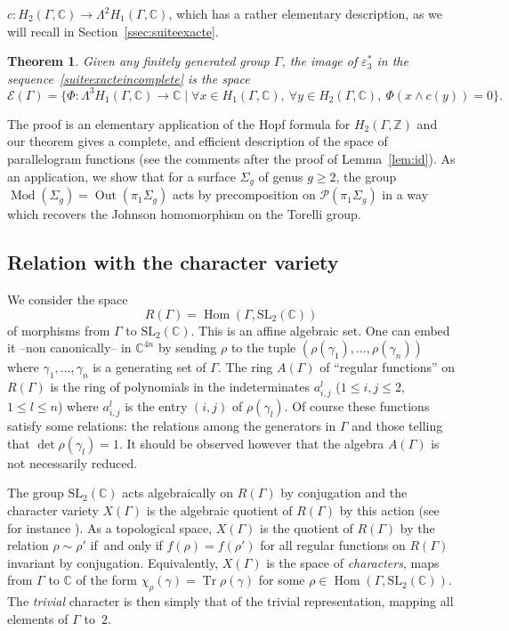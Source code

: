 \documentclass[JEP,XML,SOM,Unicode,NoEqCountersInSection]{cedram}
\let\mathcal\mathscr
\let\ra\rightarrow
\newtheorem{theorem}{Theorem}[section]
\theoremstyle{definition}
\newcommand{\ZZ}{\mathbb{Z}}
\newcommand{\CC}{\mathbb{C}}
\newcommand{\tr}{\operatorname{Tr}}
\newcommand{\SL}{\mathrm{SL}}
\newcommand{\Hom}{\operatorname{Hom}}
\begin{document}
$c:H_2(\Gamma,\CC)\to \Lambda^2 H_1(\Gamma,\CC)$,
which has a rather elementary description, as we will recall
in Section~\ref{ssec:suiteexacte}.
\begin{theorem}\label{theo:parallel}
Given any finitely generated group $\Gamma$, the image of
$\varepsilon_3^*$ in the sequence~\eqref{suiteexacteincomplete} is the
space
\[\mathcal{E}(\Gamma)=\bigl\lbrace
\Phi\colon\Lambda^3H_1(\Gamma,\CC)\ra\CC\mid\forall x\in H_1(\Gamma,\CC),\
\forall y\in H_2(\Gamma,\CC),\ \Phi(x\wedge c(y))=0
\bigr\rbrace. \]
\end{theorem}
The proof is an elementary application of the Hopf formula for
$H_2(\Gamma,\ZZ)$ and our theorem gives a complete, and efficient
description of the space of parallelogram functions (see the comments
after the proof of Lemma~\ref{lem:id}).
As an application, we show that for a surface $\Sigma_g$ of genus $g\geq 2$,
the group
$\operatorname{Mod}(\Sigma_g)=\operatorname{Out}(\pi_1 \Sigma_g)$ acts by
precomposition on $\mathcal{P}(\pi_1\Sigma_g)$ in a way which recovers
the Johnson homomorphism on the Torelli group.

\subsection{Relation with the character variety}\label{introcarac}

We consider the space
\[ R(\Gamma) = \Hom(\Gamma,\SL_2(\CC)) \]
of morphisms from $\Gamma$ to $\SL_2(\CC)$. This is an affine algebraic set.
One can embed it --non canonically-- in $\CC^{4n}$ by sending $\rho$ to the
tuple $(\rho(\gamma_1),\ldots,\rho(\gamma_n))$ where
$\gamma_1,\ldots,\gamma_n$ is a generating set of $\Gamma$.
The ring $A(\Gamma)$ of ``regular functions'' on $R(\Gamma)$ is the ring of
polynomials in the indeterminates $a_{i,j}^l$
($1\leq i,j\leq 2$, $1\leq l\leq n$)
where $a_{i,j}^l$ is the entry $(i,j)$ of $\rho(\gamma_l)$. Of course
these functions satisfy some relations: the relations among the generators
in $\Gamma$ and those telling that $\det \rho(\gamma_l)=1$.
It should be observed however that
the algebra $A(\Gamma)$ is not necessarily reduced.

The group $\SL_2(\CC)$ acts algebraically on $R(\Gamma)$ by conjugation and
the character variety $X(\Gamma)$ is the algebraic quotient of $R(\Gamma)$ by
this action (see for instance \cite[\S5.1]{Mukai}).
As a topological space, $X(\Gamma)$ is the quotient of
$R(\Gamma)$ by the relation $\rho\sim\rho'$ if~and only if
$f(\rho)=f(\rho')$ for all regular functions on $R(\Gamma)$ invariant
by conjugation.
Equivalently, $X(\Gamma)$ is the space of
{\em characters}, \ie 
maps from $\Gamma$ to $\CC$ of the form $\chi_\rho(\gamma)=\tr \rho(\gamma)$
for some $\rho\in \Hom(\Gamma,\SL_2(\CC))$.
The {\em trivial} character is then simply that of the trivial representation,
mapping all elements of $\Gamma$ to~$2$.
\end{document}
